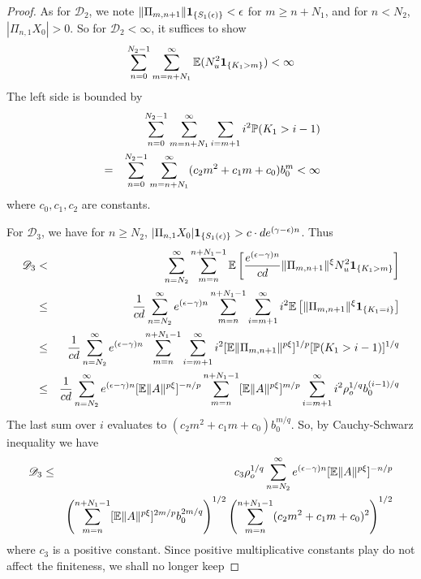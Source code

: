 \documentclass[aoas,preprint]{imsart}
\numberwithin{equation}{section}
\theoremstyle{plain}
\begin{document}
\begin{proof}
As for $\mathscr D_2$, we note
$\|\Pi_{m, n+1}\|\1{S_1(\epsilon)} < \epsilon$
for $m \geq n + N_1$, and for $n < N_2$,
$|\Pi_{n, 1} X_0| > 0$. So for $\mathscr D_2 < \infty$, it suffices to
show
\[
\sum_{n=0}^{N_2 - 1} \sum_{m=n+N_1}^\infty
\E (N_u^2 \1{K_1 > m}) < \infty
\]
The left side is bounded by
\begin{eqnarray*}
  &&
  \sum_{n=0}^{N_2 - 1} \sum_{m=n+N_1}^\infty \sum_{i=m+1}
  i^2 \P(K_1 > i - 1) \\
  &=&
  \sum_{n=0}^{N_2 - 1} \sum_{m=n+N_1}^\infty
  (c_2 m^2 + c_1 m + c_0)b_0^m < \infty
\end{eqnarray*}
where $c_0, c_1, c_2$ are constants.

For $\mathscr D_3$, we have for $n \geq N_2$,
$|\Pi_{n, 1} X_0| \1{S_1(\epsilon)} > c \cdot d e^{(\gamma - \epsilon) n}$.
Thus
\begin{eqnarray*}
  \mathscr D_3
  &<&
  \sum_{n=N_2}^\infty \sum_{m=n}^{n + N_1 - 1}
  \E \left[
    {
      e^{(\epsilon - \gamma) n}
      \over
      cd
    } \|\Pi_{m, n+1}\|^\xi
    N_u^2
    \1{K_1 > m}
    \right] \\
  &\leq&
  \frac{1}{cd}
  \sum_{n=N_2}^\infty
  e^{(\epsilon - \gamma) n}
  \sum_{m=n}^{n + N_1 - 1}
  \sum_{i=m+1}^\infty
  i^2
  \E \left[
    \|\Pi_{m, n+1}\|^\xi
    \1{K_1 = i}
    \right] \\
  &\leq&
  \frac{1}{cd}
  \sum_{n=N_2}^\infty
  e^{(\epsilon - \gamma) n}
  \sum_{m=n}^{n + N_1 - 1}
  \sum_{i=m+1}^\infty
  i^2
  [\E  \|\Pi_{m, n+1}\|^{p \xi}]^{1/p}
  [\P(K_1 > i-1)]^{1/q} \\
  &\leq&
  \frac{1}{cd}
  \sum_{n=N_2}^\infty
  e^{(\epsilon - \gamma) n}
  [\E \|A\|^{p \xi}]^{-n/p}
  \sum_{m=n}^{n + N_1 - 1}
   [\E  \|A\|^{p \xi}]^{m/p}
  \sum_{i=m+1}^\infty
  i^2 \rho_o^{1/q} b_0^{(i-1)/q}
\end{eqnarray*}
The last sum over $i$ evaluates to
$(c_2 m^2 + c_1 m + c_0) b_0^{m/q}$. So, by Cauchy-Schwarz inequality
we have
\begin{eqnarray*}
  \mathscr D_3
  &\leq&
  c_3 \rho_o^{1/q}
  \sum_{n=N_2}^\infty
  e^{(\epsilon - \gamma) n}
  [\E \|A\|^{p \xi}]^{-n/p} \\
  &&
  \left(
  \sum_{m=n}^{n + N_1 - 1}
      [\E  \|A\|^{p \xi}]^{2m/p}
      b_0^{2m/q}
 \right)^{1/2}
 \left(      
 \sum_{m=n}^{n + N_1 - 1}
 (c_2 m^2 + c_1 m + c_0)^2
  \right)^{1/2}
\end{eqnarray*}
where $c_3$ is a positive constant. Since positive multiplicative
constants play do not affect the finiteness, we shall no longer keep

\end{proof}
\end{document}
